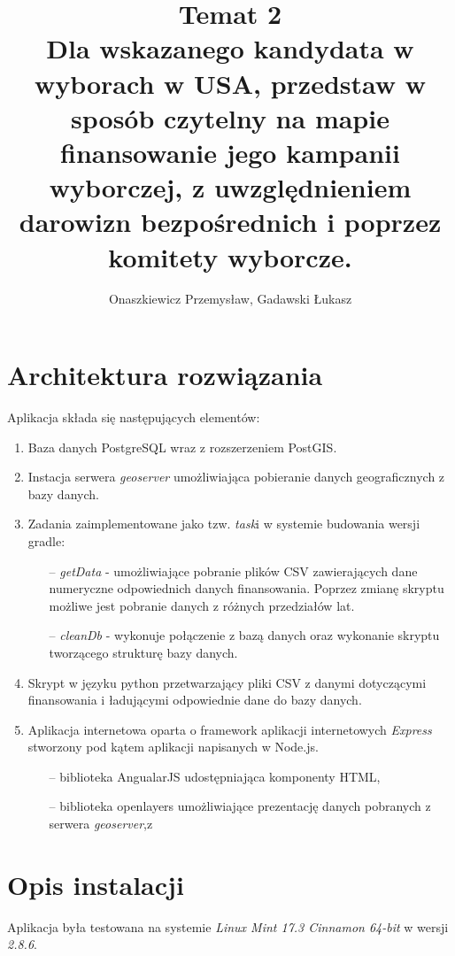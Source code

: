 \documentclass[10pt,a4paper]{article}
\author{Onaszkiewicz Przemysław, Gadawski Łukasz}
\title{Temat 2\\ Dla wskazanego kandydata w wyborach w USA, przedstaw w sposób czytelny na mapie finansowanie jego kampanii wyborczej, z uwzględnieniem darowizn bezpośrednich i poprzez komitety wyborcze. 
}
\begin{document}
\maketitle

\section{Architektura rozwiązania}
Aplikacja składa się następujących elementów:
\begin{enumerate}
\item Baza danych PostgreSQL wraz z rozszerzeniem PostGIS.
\item Instacja serwera \textit{geoserver} umożliwiająca pobieranie danych geograficznych z bazy danych.
\item Zadania zaimplementowane jako tzw. \textit{task}i w systemie budowania wersji gradle:
\begin{itemize}
\item[--] \textit{getData} - umożliwiające pobranie plików CSV zawierających dane numeryczne odpowiednich danych finansowania. Poprzez zmianę skryptu możliwe jest pobranie danych z różnych przedziałów lat.
\item[--] \textit{cleanDb} - wykonuje połączenie z bazą danych oraz wykonanie skryptu tworzącego strukturę bazy danych.
\end{itemize} 
\item Skrypt w języku python przetwarzający pliki CSV z danymi dotyczącymi finansowania i ładującymi odpowiednie dane do bazy danych.
\item Aplikacja internetowa oparta o framework aplikacji internetowych \textit{Express} stworzony pod kątem aplikacji napisanych w Node.js.
\begin{itemize}
\item[--] biblioteka AngualarJS udostępniająca komponenty HTML,
\item[--] biblioteka openlayers umożliwiające prezentację danych pobranych z serwera \textit{geoserver},z
\end{itemize}
\end{enumerate}
\section{Opis instalacji}
Aplikacja była testowana na systemie \textit{Linux Mint 17.3 Cinnamon 64-bit} w wersji \textit{2.8.6}. 
\end{document}
